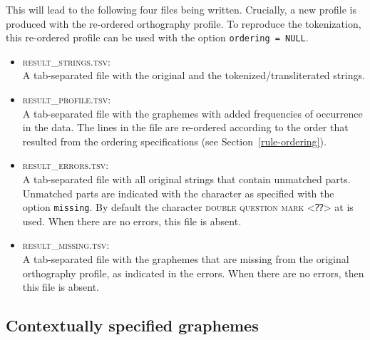 \documentclass[output=inprep,
		biblatex
		]{LSP/langsci}\usepackage[]{graphicx}\usepackage[]{color}
\begin{document}
This will lead to the following four files being written. Crucially, a
new profile is produced with the re-ordered orthography profile. To reproduce
the tokenization, this re-ordered profile can be used with the option
\texttt{ordering~=~NULL}.

\begin{itemize}
  
   \item \textsc{result\_strings.tsv}:\\ A tab-separated file with the original
         and the tokenized/transliterated strings.

   \item \textsc{result\_profile.tsv}:\\ A tab-separated file with the
         graphemes with added frequencies of occurrence in the data. The lines
         in the file are re-ordered according to the order that resulted from the
         ordering specifications (see Section~\ref{rule-ordering}).

   \item \textsc{result\_errors.tsv}:\\ A tab-separated file with all original
         strings that contain unmatched parts. Unmatched parts are indicated
         with the character as specified with the option \texttt{missing}. By
         default the character \textsc{double question mark} <⁇> at
          is used. When there are no errors, this file is 
         absent.

    \item \textsc{result\_missing.tsv}:\\ A tab-separated file with the graphemes
          that are missing from the original orthography profile, as indicated in
          the errors. When there are no errors, then this file is absent.
          
\end{itemize}

\subsection*{Contextually specified graphemes}
\label{contextual-specification}
\end{document}
